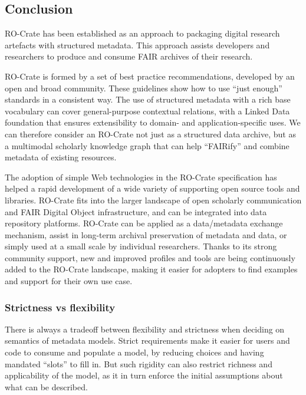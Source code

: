 \hypertarget{conclusion}{%
\subsection{Conclusion}\label{ch5:conclusion}}

RO-Crate has been established as an approach to packaging digital
research artefacts with structured metadata. This approach assists
developers and researchers to produce and consume FAIR archives of their
research.

RO-Crate is formed by a set of best practice recommendations, developed
by an open and broad community. These guidelines show how to use ``just
enough'' standards in a consistent way. The use of structured metadata
with a rich base vocabulary can cover general-purpose contextual
relations, with a Linked Data foundation that ensures extensibility to
domain- and application-specific uses. We can therefore consider an
RO-Crate not just as a structured data archive, but as a multimodal
scholarly knowledge graph that can help ``FAIRify'' and combine metadata
of existing resources.

The adoption of simple Web technologies in the RO-Crate specification
has helped a rapid development of a wide variety of supporting open
source tools and libraries. RO-Crate fits into the larger landscape of
open scholarly communication and FAIR Digital Object infrastructure, and
can be integrated into data repository platforms. RO-Crate can be
applied as a data/metadata exchange mechanism, assist in long-term
archival preservation of metadata and data, or simply used at a small
scale by individual researchers. Thanks to its strong community support,
new and improved profiles and tools are being continuously added to the
RO-Crate landscape, making it easier for adopters to find examples and
support for their own use case.

\subsubsection{Strictness vs
flexibility}\label{ch5:strictness-vs-flexibility}

There is always a tradeoff between flexibility and strictness \cite{ch5-116}
when deciding on semantics of metadata models. Strict requirements make
it easier for users and code to consume and populate a model, by
reducing choices and having mandated ``slots'' to fill in. But such
rigidity can also restrict richness and applicability of the model, as
it in turn enforce the initial assumptions about what can be described.

